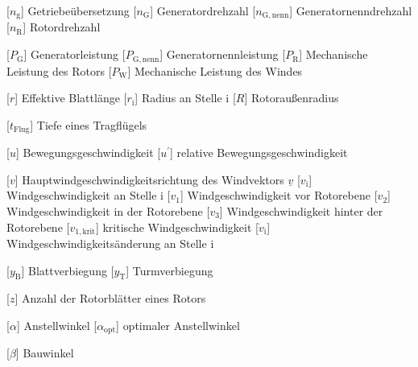 \documentclass[
	pagesize,
	fontsize=12pt,
	paper=a4,
	oneside,
    reqno
]{scrartcl}
\numberwithin{equation}{section} %
\numberwithin{table}{section} %
\numberwithin{figure}{section} %
\begin{document}
\begin{acronym}[Symbols]
           [$n_{\mathrm{g}}$]          {Getriebeübersetzung}
           [$n_{\mathrm{G}}$]          {Generatordrehzahl}
       [$n_{\mathrm{G,nenn}}$]     {Generatornenndrehzahl}
           [$n_{\mathrm{R}}$]          {Rotordrehzahl}
    
           [$P_{\mathrm{G}}$]          {Generatorleistung}
       [$P_{\mathrm{G,nenn}}$]     {Generatornennleistung}
           [$P_{\mathrm{R}}$]          {Mechanische Leistung des Rotors}
           [$P_{\mathrm{W}}$]          {Mechanische Leistung des Windes}    
    
            [$r$]                       {Effektive Blattlänge}
           [$r_{\mathrm{i}}$]          {Radius an Stelle i}
            [$R$]                       {Rotoraußenradius}
    
        [$t_{\mathrm{Flug}}$]       {Tiefe eines Tragflügels}
    
            [$u$]                       {Bewegungsgeschwindigkeit}
           [$u^{'}$]                   {relative Bewegungsgeschwindigkeit}
    
            [$v$]                       {Hauptwindgeschwindigkeitsrichtung des Windvektors $\underline v$}
           [$v_{\mathrm{i}}$]          {Windgeschwindigkeit an Stelle i}
           [$v_{\mathrm{1}}$]          {Windgeschwindigkeit vor Rotorebene}
           [$v_{\mathrm{2}}$]          {Windgeschwindigkeit in der Rotorebene}
           [$v_{\mathrm{3}}$]          {Windgeschwindigkeit hinter der Rotorebene}
        [$v_{\mathrm{1,krit}}$]     {kritische Windgeschwindigkeit}
        [$\dot{v}_{\mathrm{i}}$]    {Windgeschwindigkeitsänderung an Stelle i}
    
           [$y_{\mathrm{B}}$]          {Blattverbiegung}
           [$y_{\mathrm{T}}$]          {Turmverbiegung}
    
            [$z$]                       {Anzahl der Rotorblätter eines Rotors}
    
        [$\alpha$]                  {Anstellwinkel}
     [$\alpha_{\mathrm{opt}}$]   {optimaler Anstellwinkel}
    
         [$\beta$]                   {Bauwinkel}
    

\end{acronym}
\end{document}
